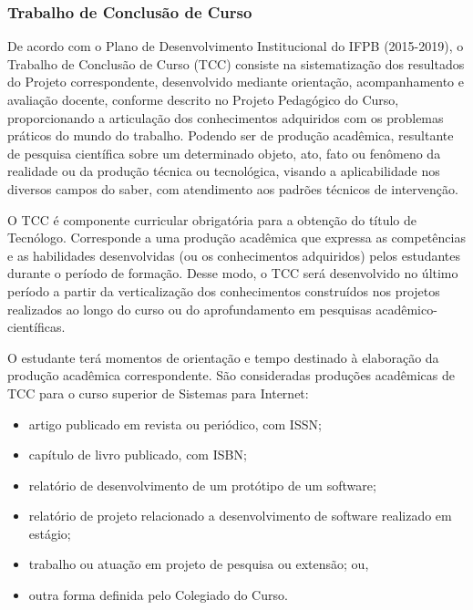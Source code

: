 \subsubsection{Trabalho de Conclusão de Curso}

De acordo com o Plano de Desenvolvimento Institucional do IFPB (2015-2019), o Trabalho de Conclusão de Curso (TCC) consiste na sistematização dos resultados do Projeto correspondente, desenvolvido mediante orientação, acompanhamento e avaliação docente, conforme descrito no Projeto Pedagógico do Curso, proporcionando a articulação dos conhecimentos adquiridos com os problemas práticos do mundo do trabalho. Podendo ser de produção acadêmica, resultante de pesquisa científica sobre um determinado objeto, ato, fato ou fenômeno da realidade ou da produção técnica ou tecnológica, visando a aplicabilidade nos diversos campos do saber, com atendimento aos padrões técnicos de intervenção.

O TCC é componente curricular obrigatória para a obtenção do título de Tecnólogo. Corresponde a uma produção acadêmica que expressa as competências e as habilidades desenvolvidas (ou os conhecimentos adquiridos) pelos estudantes durante o período de formação. Desse modo, o TCC será desenvolvido no último período a partir da verticalização dos conhecimentos construídos nos projetos realizados ao longo do curso ou do aprofundamento em pesquisas acadêmico-científicas.

O estudante terá momentos de orientação e tempo destinado à elaboração da produção acadêmica correspondente. São consideradas produções acadêmicas de TCC para o curso superior de Sistemas para Internet:

\begin{itemize}
	\item artigo publicado em revista ou periódico, com ISSN;
	\item capítulo de livro publicado, com ISBN;
	\item relatório de desenvolvimento de um protótipo de um software;
	\item relatório de projeto relacionado a desenvolvimento de software realizado em estágio;
	\item trabalho ou atuação em projeto de pesquisa ou extensão; ou,
	\item outra forma definida pelo Colegiado do Curso.
\end{itemize}
	

